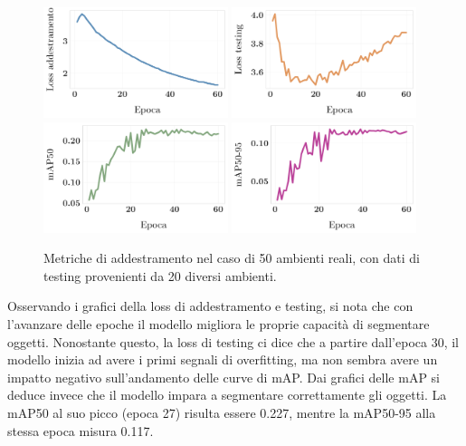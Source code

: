 \documentclass[12pt]{report}
\begin{document}
\begin{figure}[h!]
	\centering
	{\includegraphics[width=0.48\textwidth]{images/domain-shift/real-to-real/2/train-loss}}
	\hspace{0.01\textwidth}
	{\includegraphics[width=0.48\textwidth]{images/domain-shift/real-to-real/2/testing-loss}}
	\hspace{0.01\textwidth}
	\\
	{\includegraphics[width=0.48\textwidth]{images/domain-shift/real-to-real/2/map50}}
	\hspace{0.01\textwidth}
	{\includegraphics[width=0.48\textwidth]{images/domain-shift/real-to-real/2/map50-95}}
	\caption{Metriche di addestramento nel caso di 50 ambienti reali, con dati di testing provenienti da 20 diversi ambienti.}
	\label{fig:training-4}
\end{figure}

Osservando i grafici della loss di addestramento e testing, si nota che con l'avanzare delle epoche il modello migliora le proprie capacità di segmentare oggetti. Nonostante questo, la loss di testing ci dice che a partire dall'epoca 30, il modello inizia ad avere i primi segnali di overfitting, ma non sembra avere un impatto negativo sull'andamento delle curve di mAP. Dai grafici delle mAP si deduce invece che il modello impara a segmentare correttamente gli oggetti. La mAP50 al suo picco (epoca 27) risulta essere 0.227, mentre la mAP50-95 alla stessa epoca misura 0.117.
\end{document}
